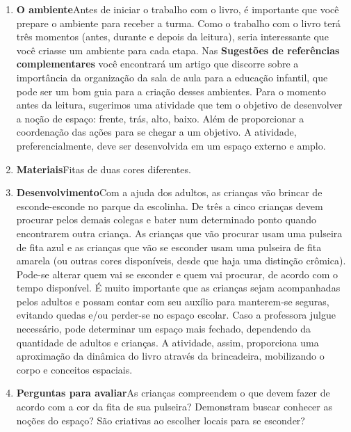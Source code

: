 \documentclass[11pt]{extarticle}
\begin{document}


\begin{enumerate}
\item \textbf{O ambiente}\quad Antes de iniciar o trabalho com o livro, é importante que você 
prepare o ambiente para receber a turma. Como o trabalho com o livro terá 
três momentos (antes, durante e depois da leitura), seria interessante que você 
criasse um ambiente para cada etapa. Nas \textbf{Sugestões de referências complementares} 
você encontrará um artigo que discorre sobre a importância da organização da sala 
de aula para a educação infantil, que pode ser um bom guia para a criação desses 
ambientes.
Para o momento antes da leitura, sugerimos uma atividade que tem o objetivo de desenvolver a noção de espaço: frente, trás, alto, baixo. Além de proporcionar a coordenação das ações para se chegar a um objetivo. A atividade, preferencialmente, deve ser desenvolvida em um espaço externo e amplo.

\item \textbf{Materiais}\quad Fitas de duas cores diferentes.

\item \textbf{Desenvolvimento}\quad Com a ajuda dos adultos, as crianças vão brincar de esconde-esconde no parque da escolinha. De três a cinco crianças devem procurar pelos demais colegas e bater num determinado ponto quando encontrarem outra criança. As crianças que vão procurar usam uma pulseira de fita azul e as crianças que vão se esconder usam uma pulseira de fita amarela (ou outras cores disponíveis, desde que haja uma distinção crômica). Pode-se alterar quem vai se esconder e quem vai procurar, de acordo com o tempo disponível. É muito importante que as crianças sejam acompanhadas pelos adultos e possam contar com seu auxílio para manterem-se seguras, evitando quedas e/ou perder-se no espaço escolar. Caso a professora julgue necessário, pode determinar um espaço mais fechado, dependendo da quantidade de adultos e crianças. A atividade, assim, proporciona uma aproximação da dinâmica do livro através da brincadeira, mobilizando o corpo e conceitos espaciais.

\item \textbf{Perguntas para avaliar}\quad As crianças compreendem o que devem fazer de acordo com a cor da fita de sua pulseira? Demonstram buscar conhecer as noções do espaço? São criativas ao escolher locais para se esconder?

\end{enumerate}
\end{document}
